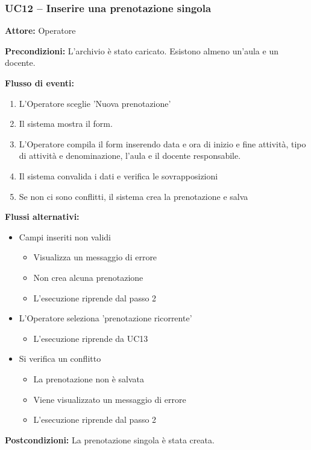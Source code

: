 \documentclass[a4paper,11pt]{article}
\begin{document}
\begin{samepage}
\subsubsection*{UC12 -- Inserire una prenotazione singola}
\begin{ucbox}

\noindent\textbf{Attore:} Operatore\par
\noindent\textbf{Precondizioni:} L'archivio è stato caricato. Esistono almeno un'aula e un docente. \par

\noindent\textbf{Flusso di eventi:}
\begin{enumerate}
\item L'Operatore sceglie 'Nuova prenotazione' \item Il sistema mostra il form. \item L'Operatore compila il form inserendo data e ora di inizio e fine attività, tipo di attività e denominazione, l'aula e il docente responsabile. \item Il sistema convalida i dati e verifica le sovrapposizioni \item Se non ci sono conflitti, il sistema crea la prenotazione e salva \end{enumerate}
\noindent\textbf{Flussi alternativi:}
\begin{itemize}
\item[3a.] Campi inseriti non validi
\begin{itemize}
\item Visualizza un messaggio di errore
\item Non crea alcuna prenotazione
\item L'esecuzione riprende dal passo 2
\end{itemize}
\item[3b.] L'Operatore seleziona 'prenotazione ricorrente'
\begin{itemize}
\item L'esecuzione riprende da UC13
\end{itemize}
\item[4a.] Si verifica un conflitto
\begin{itemize}
\item La prenotazione non è salvata
\item Viene visualizzato un messaggio di errore
\item L'esecuzione riprende dal passo 2
\end{itemize}
\end{itemize}
\noindent\textbf{Postcondizioni:} La prenotazione singola è stata creata.\par
\end{ucbox}
\end{samepage}
\end{document}
